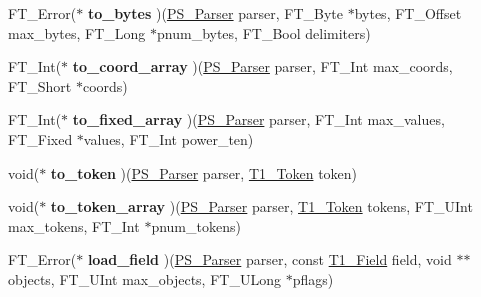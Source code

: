 \begin{DoxyCompactItemize}
\item 
\hypertarget{struct_p_s___parser___funcs_rec___abbda6afe648361ec1efa535fc853ce54}{F\-T\-\_\-\-Error($\ast$ {\bfseries to\-\_\-bytes} )(\hyperlink{struct_p_s___parser_rec__}{P\-S\-\_\-\-Parser} parser, F\-T\-\_\-\-Byte $\ast$bytes, F\-T\-\_\-\-Offset max\-\_\-bytes, F\-T\-\_\-\-Long $\ast$pnum\-\_\-bytes, F\-T\-\_\-\-Bool delimiters)}\label{struct_p_s___parser___funcs_rec___abbda6afe648361ec1efa535fc853ce54}

\item 
\hypertarget{struct_p_s___parser___funcs_rec___a11da5ac33187bc7b67696a9d24f3d239}{F\-T\-\_\-\-Int($\ast$ {\bfseries to\-\_\-coord\-\_\-array} )(\hyperlink{struct_p_s___parser_rec__}{P\-S\-\_\-\-Parser} parser, F\-T\-\_\-\-Int max\-\_\-coords, F\-T\-\_\-\-Short $\ast$coords)}\label{struct_p_s___parser___funcs_rec___a11da5ac33187bc7b67696a9d24f3d239}

\item 
\hypertarget{struct_p_s___parser___funcs_rec___a5b9316c7a5459857da99f6158afdf3d9}{F\-T\-\_\-\-Int($\ast$ {\bfseries to\-\_\-fixed\-\_\-array} )(\hyperlink{struct_p_s___parser_rec__}{P\-S\-\_\-\-Parser} parser, F\-T\-\_\-\-Int max\-\_\-values, F\-T\-\_\-\-Fixed $\ast$values, F\-T\-\_\-\-Int power\-\_\-ten)}\label{struct_p_s___parser___funcs_rec___a5b9316c7a5459857da99f6158afdf3d9}

\item 
\hypertarget{struct_p_s___parser___funcs_rec___ad963b97fac4a1ae52f4a68e693f39907}{void($\ast$ {\bfseries to\-\_\-token} )(\hyperlink{struct_p_s___parser_rec__}{P\-S\-\_\-\-Parser} parser, \hyperlink{struct_t1___token_rec__}{T1\-\_\-\-Token} token)}\label{struct_p_s___parser___funcs_rec___ad963b97fac4a1ae52f4a68e693f39907}

\item 
\hypertarget{struct_p_s___parser___funcs_rec___ac3cb6fd9c5eb16d8d853fa02e57602c2}{void($\ast$ {\bfseries to\-\_\-token\-\_\-array} )(\hyperlink{struct_p_s___parser_rec__}{P\-S\-\_\-\-Parser} parser, \hyperlink{struct_t1___token_rec__}{T1\-\_\-\-Token} tokens, F\-T\-\_\-\-U\-Int max\-\_\-tokens, F\-T\-\_\-\-Int $\ast$pnum\-\_\-tokens)}\label{struct_p_s___parser___funcs_rec___ac3cb6fd9c5eb16d8d853fa02e57602c2}

\item 
\hypertarget{struct_p_s___parser___funcs_rec___a1e3a763197f876746bc053bee27a3b86}{F\-T\-\_\-\-Error($\ast$ {\bfseries load\-\_\-field} )(\hyperlink{struct_p_s___parser_rec__}{P\-S\-\_\-\-Parser} parser, const \hyperlink{struct_t1___field_rec__}{T1\-\_\-\-Field} field, void $\ast$$\ast$objects, F\-T\-\_\-\-U\-Int max\-\_\-objects, F\-T\-\_\-\-U\-Long $\ast$pflags)}\label{struct_p_s___parser___funcs_rec___a1e3a763197f876746bc053bee27a3b86}


\end{DoxyCompactItemize}
